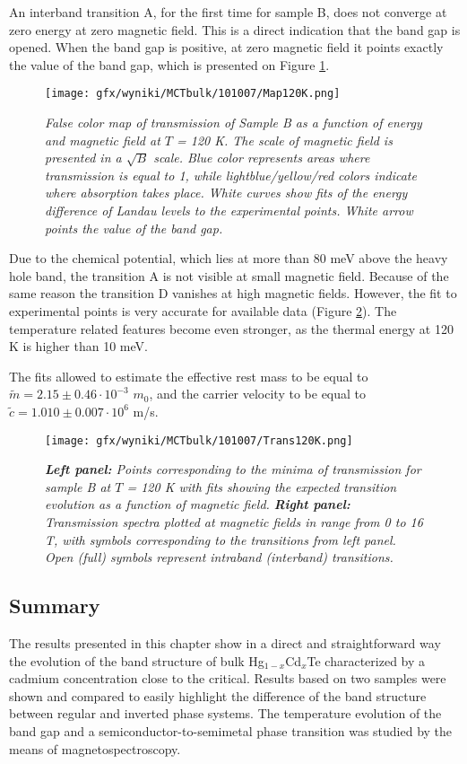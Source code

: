 \documentclass[titlepage,a4paper]{book}
\begin{document}
An interband transition A, for the first time for sample B, does not converge at zero energy at zero magnetic field. This is a direct indication that the band gap is opened. When the band gap is positive, at zero magnetic field it points exactly the value of the band gap, which is presented on Figure \ref{fig:Map_101007_120K}. 
\begin{figure}[ht]
	\centering
	\texttt{[image: gfx/wyniki/MCTbulk/101007/Map120K.png]}
	\vspace{-10pt}
	\caption{\textit{False color map of transmission of Sample B as a function of energy and magnetic field at $T$ = 120 K. The scale of magnetic field is presented in a $\sqrt{B}$ scale. Blue color represents areas where transmission is equal to 1, while lightblue/yellow/red colors indicate where absorption takes place. White curves show fits of the energy difference of Landau levels to the experimental points. White arrow points the value of the band gap.}}
	\label{fig:Map_101007_120K}
\end{figure} 
Due to the chemical potential, which lies at more than 80 meV above the heavy hole band, the transition A is not visible at small magnetic field. Because of the same reason the transition D vanishes at high magnetic fields. However, the fit to experimental points is very accurate for available data (Figure \ref{fig:Spectra_101007_120K}). The temperature related features become even stronger, as the thermal energy at 120 K is higher than 10 meV.

The fits allowed to estimate the effective rest mass to be equal to $\tilde m = 2.15 \pm 0.46 \cdot 10^{-3}$ $m_0$, and the carrier velocity to be equal to $\tilde{c} = 1.010 \pm 0.007 \cdot 10^6$ m/s.

\begin{figure}[ht]
	\centering
	\texttt{[image: gfx/wyniki/MCTbulk/101007/Trans120K.png]}
	\vspace{-10pt}
	\caption{\textit{\textbf{Left panel:} Points corresponding to the minima of transmission for sample B at $T$ = 120 K with fits showing the expected transition evolution as a function of magnetic field. \textbf{Right panel:} Transmission spectra plotted at magnetic fields in range from 0 to 16 T, with symbols corresponding to the transitions from left panel. Open (full) symbols represent intraband (interband) transitions.}}
	\label{fig:Spectra_101007_120K}
\end{figure}

\clearpage
\subsection{Summary}
The results presented in this chapter show in a direct and straightforward way the evolution of the band structure of bulk Hg$_{1-x}$Cd$_{x}$Te characterized by a cadmium concentration close to the critical. Results based on two samples were shown and compared to easily highlight the difference of the band structure between regular and inverted phase systems. The temperature evolution of the band gap and a semiconductor-to-semimetal phase transition was studied by the means of magnetospectroscopy. 
\end{document}
